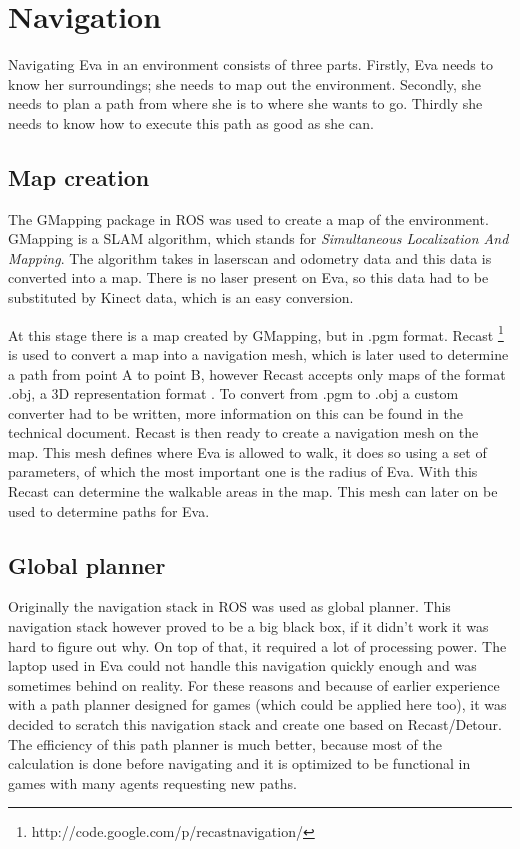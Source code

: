 \documentclass[project_eva.tex]{subfiles}
\begin{document}
\section*{Navigation}
Navigating Eva in an environment consists of three parts. Firstly, Eva needs to know her surroundings; she needs to map out the environment. Secondly, she needs to plan a path from where she is to where she wants to go. Thirdly she needs to know how to execute this path as good as she can.
\subsection*{Map creation}
The GMapping package in ROS was used to create a map of the environment. GMapping \cite{GMapping} is a SLAM algorithm, which stands for \textit{Simultaneous Localization And Mapping}. The algorithm takes in laserscan and odometry data and this data is converted into a map. There is no laser present on Eva, so this data had to be substituted by Kinect data, which is an easy conversion.

At this stage there is a map created by GMapping, but in .pgm format. Recast \footnote{http://code.google.com/p/recastnavigation/} is used to convert a map into a navigation mesh, which is later used to determine a path from point A to point B, however Recast accepts only maps of the format .obj, a 3D representation format \cite{wavefront} . To convert from .pgm to .obj a custom converter had to be written, more information on this can be found in the technical document. Recast is then ready to create a navigation mesh on the map. This mesh defines where Eva is allowed to walk, it does so using a set of parameters, of which the most important one is the radius of Eva. With this Recast can determine the walkable areas in the map. This mesh can later on be used to determine paths for Eva.
\subsection*{Global planner}
Originally the navigation stack in ROS was used as global planner. This navigation stack however proved to be a big black box, if it didn't work it was hard to figure out why. On top of that, it required a lot of processing power. The laptop used in Eva could not handle this navigation quickly enough and was sometimes behind on reality. For these reasons and because of earlier experience with a path planner designed for games (which could be applied here too), it was decided to scratch this navigation stack and create one based on Recast/Detour. The efficiency of this path planner is much better, because most of the calculation is done before navigating and it is optimized to be functional in games with many agents requesting new paths.
\end{document}

